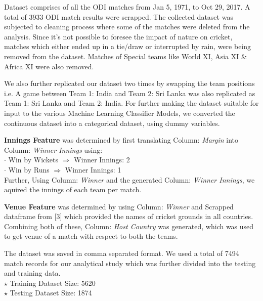 \documentclass[a4paper, 10pt, conference]{IEEEtran}
\begin{document}
Dataset comprises of all the ODI matches from Jan 5, 1971, to Oct 29, 2017. A total of 3933 ODI match results were scrapped. The collected dataset was subjected to cleaning process where some of the matches were deleted from the analysis. Since it's not possible to foresee the impact of nature on cricket, matches which either ended up in a tie/draw or interrupted by rain, were being removed from the dataset. Matches of Special teams like World XI, Asia XI \& Africa XI were also removed.

We also further replicated our dataset two times by swapping the team positions i.e. A game between Team 1: India and Team 2: Sri Lanka was also replicated as Team 1: Sri Lanka and Team 2: India. For further making the dataset suitable for input to the various Machine Learning Classifier Models, we converted the continuous dataset into a categorical dataset, using dummy variables.

\textbf{Innings Feature} was determined by first translating Column: \textit{Margin} into Column: \textit{Winner Innings} using:\\
\indent \indent $\cdot$ Win by Wickets  $\Longrightarrow$  Winner Innings: 2\\
\indent \indent $\cdot$ Win by Runs \indent $ \Longrightarrow$  Winner Innings: 1
\\Further, Using Column: \textit{Winner} and the generated  Column: \textit{Winner Innings}, we aquired the innings of each team per match.

\textbf{Venue Feature} was determined by using Column: \textit{Winner} and Scrapped dataframe from [3] which provided the names of cricket grounds in all countries. Combining both of these, Column: \textit{Host Country} was generated, which was used to get venue of a match with respect to both the teams.

The dataset was saved in comma separated format. We used a total of 7494 match records for our analytical study which was further divided into the testing and training data.
\\$\star$ Training Dataset Size: 5620
\\$\star$ Testing Dataset Size: 1874
\end{document}
